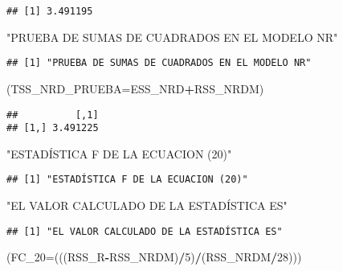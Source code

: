 \documentclass[
]{article}
\newenvironment{Shaded}{\begin{snugshade}}{\end{snugshade}}
\newcommand{\DataTypeTok}[1]{\textcolor[rgb]{0.13,0.29,0.53}{#1}}
\newcommand{\DecValTok}[1]{\textcolor[rgb]{0.00,0.00,0.81}{#1}}
\newcommand{\NormalTok}[1]{#1}
\newcommand{\OperatorTok}[1]{\textcolor[rgb]{0.81,0.36,0.00}{\textbf{#1}}}
\newcommand{\StringTok}[1]{\textcolor[rgb]{0.31,0.60,0.02}{#1}}
\begin{document}
\begin{verbatim}
## [1] 3.491195
\end{verbatim}

\begin{Shaded}
\begin{Highlighting}[]
\StringTok{"PRUEBA DE SUMAS DE CUADRADOS EN EL MODELO NR"}
\end{Highlighting}
\end{Shaded}

\begin{verbatim}
## [1] "PRUEBA DE SUMAS DE CUADRADOS EN EL MODELO NR"
\end{verbatim}

\begin{Shaded}
\begin{Highlighting}[]
\NormalTok{(}\DataTypeTok{TSS_NRD_PRUEBA=}\NormalTok{ESS_NRD}\OperatorTok{+}\NormalTok{RSS_NRDM)}
\end{Highlighting}
\end{Shaded}

\begin{verbatim}
##          [,1]
## [1,] 3.491225
\end{verbatim}

\begin{Shaded}
\begin{Highlighting}[]
\StringTok{"ESTADÍSTICA F DE LA ECUACION (20)"}
\end{Highlighting}
\end{Shaded}

\begin{verbatim}
## [1] "ESTADÍSTICA F DE LA ECUACION (20)"
\end{verbatim}

\begin{Shaded}
\begin{Highlighting}[]
\StringTok{"EL VALOR CALCULADO DE LA ESTADÍSTICA ES"}
\end{Highlighting}
\end{Shaded}

\begin{verbatim}
## [1] "EL VALOR CALCULADO DE LA ESTADÍSTICA ES"
\end{verbatim}

\begin{Shaded}
\begin{Highlighting}[]
\NormalTok{(}\DataTypeTok{FC_20=}\NormalTok{(((RSS_R}\OperatorTok{-}\NormalTok{RSS_NRDM)}\OperatorTok{/}\DecValTok{5}\NormalTok{)}\OperatorTok{/}\NormalTok{(RSS_NRDM}\OperatorTok{/}\DecValTok{28}\NormalTok{)))}
\end{Highlighting}
\end{Shaded}
\end{document}
